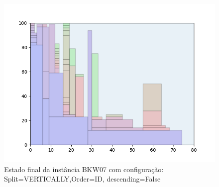 \begin{figure}[H]
    \centering
    \caption[]{Estado final da instância BKW07 com configuração: Split=VERTICALLY,Order=ID, descending=False}
    \label{fig:bkw07-vertically-id-false}
    \includegraphics[scale=0.5]{output/figures/bkw/bkw07/vertically/id/false/00}
\end{figure}